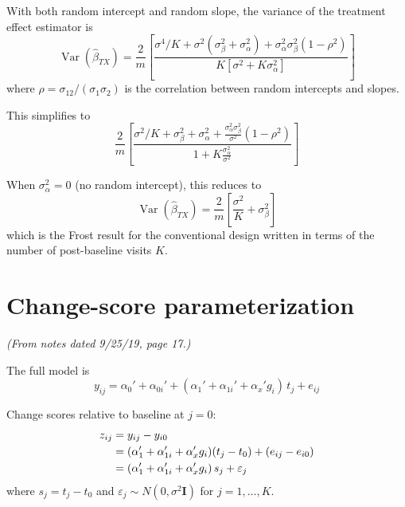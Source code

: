 \documentclass[11pt]{article}
\DeclareMathOperator{\Var}{Var}
\newcommand{\bI}{\mathbf{I}}
\begin{document}
\medskip
\noindent
With both random intercept and random slope, the variance
of the treatment effect estimator is
\begin{equation}
  \Var(\hat\beta_{TX})
  = \frac{2}{m}\left[
    \frac{\sigma^4 / K + \sigma^2(\sigma_\beta^2
      + \sigma_\alpha^2)
      + \sigma_\alpha^2 \sigma_\beta^2(1 - \rho^2)}
    {K[\sigma^2 + K\sigma_\alpha^2]}
  \right]
  \label{eq:var_full}
\end{equation}
where $\rho = \sigma_{12}/(\sigma_1 \sigma_2)$ is the
correlation between random intercepts and slopes.

This simplifies to
\begin{equation}
  \frac{2}{m}\left[
    \frac{\sigma^2/K + \sigma_\beta^2 + \sigma_\alpha^2
      + \frac{\sigma_\alpha^2 \sigma_\beta^2}{\sigma^2}
        (1-\rho^2)}
    {1 + K\frac{\sigma_\alpha^2}{\sigma^2}}
  \right]
\end{equation}

When $\sigma_\alpha^2 = 0$ (no random intercept), this
reduces to
\begin{equation}
  \Var(\hat\beta_{TX})
  = \frac{2}{m}\left[
    \frac{\sigma^2}{K} + \sigma_\beta^2
  \right]
\end{equation}
which is the Frost result for the conventional design
written in terms of the number of post-baseline visits $K$.


\section{Change-score parameterization}
\label{sec:changescore}

\noindent
\textit{(From notes dated 9/25/19, page 17.)}

\medskip
\noindent
The full model is
\begin{equation}
  y_{ij} = \alpha_0' + \alpha_{0i}'
    + (\alpha_1' + \alpha_{1i}' + \alpha_x' g_i)\,t_j
    + e_{ij}
\end{equation}

Change scores relative to baseline at $j = 0$:
\begin{align}
  z_{ij} &= y_{ij} - y_{i0} \notag \\
  &= (\alpha_1' + \alpha_{1i}' + \alpha_x' g_i)(t_j - t_0)
    + (e_{ij} - e_{i0}) \notag \\
  &= (\alpha_1' + \alpha_{1i}' + \alpha_x' g_i)\,s_j
    + \varepsilon_j
  \label{eq:change}
\end{align}
where $s_j = t_j - t_0$ and
$\varepsilon_j \sim N(0, \sigma^2 \bI)$ for
$j = 1, \ldots, K$.
\end{document}
